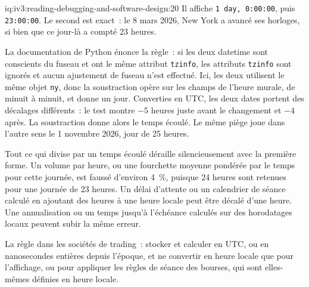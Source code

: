 \begin{solution}{iq:iv3:reading-debugging-and-software-design:20}
Il affiche \texttt{1 day, 0:00:00}, puis \texttt{23:00:00}. Le second est exact~: le 8 mars 2026, New York a avancé ses horloges, si bien que ce jour-là a compté 23 heures.

La documentation de Python énonce la règle~: si les deux datetime sont conscients du fuseau et ont le même attribut \texttt{tzinfo}, les attributs \texttt{tzinfo} sont ignorés et aucun ajustement de fuseau n'est effectué. Ici, les deux utilisent le même objet \texttt{ny}, donc la soustraction opère sur les champs de l'heure murale, de minuit à minuit, et donne un jour. Converties en UTC, les deux dates portent des décalages différents~: le test montre $-5$ heures juste avant le changement et $-4$ après. La soustraction donne alors le temps écoulé. Le même piège joue dans l'autre sens le 1 novembre 2026, jour de 25 heures.

Tout ce qui divise par un temps écoulé déraille silencieusement avec la première forme. Un volume par heure, ou une fourchette moyenne pondérée par le temps pour cette journée, est faussé d'environ 4~\%, puisque 24 heures sont retenues pour une journée de 23 heures. Un délai d'attente ou un calendrier de séance calculé en ajoutant des heures à une heure locale peut être décalé d'une heure. Une annualisation ou un temps jusqu'à l'échéance calculés sur des horodatages locaux peuvent subir la même erreur.

La règle dans les sociétés de trading~: stocker et calculer en UTC, ou en nanosecondes entières depuis l'époque, et ne convertir en heure locale que pour l'affichage, ou pour appliquer les règles de séance des bourses, qui sont elles-mêmes définies en heure locale.


\end{solution}

